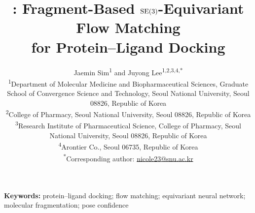 \documentclass[11pt]{article}
\title{\method: Fragment-Based \(\mathrm{SE}(3)\)-Equivariant Flow Matching\\
for Protein--Ligand Docking}
\author{\parbox{0.96\textwidth}{\centering
Jaemin Sim\textsuperscript{1} and
Juyong Lee\textsuperscript{1,2,3,4,*}\\[0.75em]
\small\textsuperscript{1}Department of Molecular Medicine and
Biopharmaceutical Sciences, Graduate School of Convergence Science and
Technology, Seoul National University, Seoul 08826, Republic of Korea\\
\small\textsuperscript{2}College of Pharmacy, Seoul National University,
Seoul 08826, Republic of Korea\\
\small\textsuperscript{3}Research Institute of Pharmaceutical Science,
College of Pharmacy, Seoul National University, Seoul 08826,
Republic of Korea\\
\small\textsuperscript{4}Arontier Co., Seoul 06735, Republic of Korea\\[0.5em]
\small\textsuperscript{*}Corresponding author:
\href{mailto:nicole23@snu.ac.kr}{nicole23@snu.ac.kr}
}}
\date{}
\begin{document}
\maketitle

\begin{abstract}

\end{abstract}

\noindent\textbf{Keywords:}
protein--ligand docking; flow matching; equivariant neural network;
molecular fragmentation; pose confidence












\appendix

\end{document}
